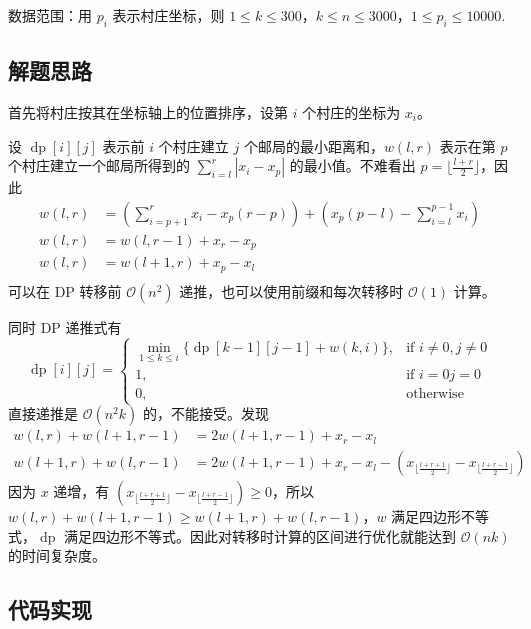 数据范围：用 \(p_i\) 表示村庄坐标，则
\(1\le k\le 300\)，\(k\le n\le 3000\)，\(1 \le p_i\le 10000\).

\subsection{解题思路}

首先将村庄按其在坐标轴上的位置排序，设第 \(i\) 个村庄的坐标为 \(x_i\)。

设 \(\operatorname{dp}[i][j]\) 表示前 \(i\) 个村庄建立 \(j\)
个邮局的最小距离和，\(w(l,r)\) 表示在第 \(p\) 个村庄建立一个邮局所得到的
\(\sum_{i=l}^r|x_i-x_p|\) 的最小值。不难看出
\(p=\lfloor \frac{l+r}{2}\rfloor\)，因此 \[
\begin{aligned}
w(l,r)&=(\sum_{i=p+1}^rx_i-x_p(r-p))+(x_p(p-l)-\sum_{i=l}^{p-1}x_i)\\
w(l,r)&=w(l,r-1)+x_r-x_p\\
w(l,r)&=w(l+1,r)+x_p-x_l\\
\end{aligned}
\] 可以在 DP 转移前 \(\mathcal{O}(n^2)\)
递推，也可以使用前缀和每次转移时 \(\mathcal{O}(1)\) 计算。

同时 DP 递推式有 \[
\operatorname{dp}[i][j]=
\left\{
\begin{array}{ll}
\min\limits_{1\le k\le i}\{\operatorname{dp}[k-1][j-1]+w(k,i)\},&\text{if } i\neq0,j\neq0\\
1,&\text{if }i=0 j=0\\
0,&\text{otherwise}
\end{array}
\right.
\] 直接递推是 \(\mathcal{O}(n^2k)\) 的，不能接受。发现 \[
\begin{aligned}
w(l,r)+w(l+1,r-1)&=2w(l+1,r-1)+x_r-x_l\\
w(l+1,r)+w(l,r-1)&=2w(l+1,r-1)+x_r-x_l-(x_{\lfloor \frac{l+r+1}{2}\rfloor}-x_{\lfloor \frac{l+r-1}{2}\rfloor})
\end{aligned}
\] 因为 \(x\) 递增，有
\((x_{\lfloor \frac{l+r+1}{2}\rfloor}-x_{\lfloor \frac{l+r-1}{2}\rfloor})\ge0\)，所以
\(w(l,r)+w(l+1,r-1)\ge w(l+1,r)+w(l,r-1)\)，\(w\)
满足四边形不等式，\(\operatorname{dp}\)
满足四边形不等式。因此对转移时计算的区间进行优化就能达到
\(\mathcal{O}(nk)\) 的时间复杂度。

\subsection{代码实现}

\inputminted[frame=lines, numbers=left, fontsize=\scriptsize, tabsize=4, breaklines=true]{c++}{code/8.cpp}
